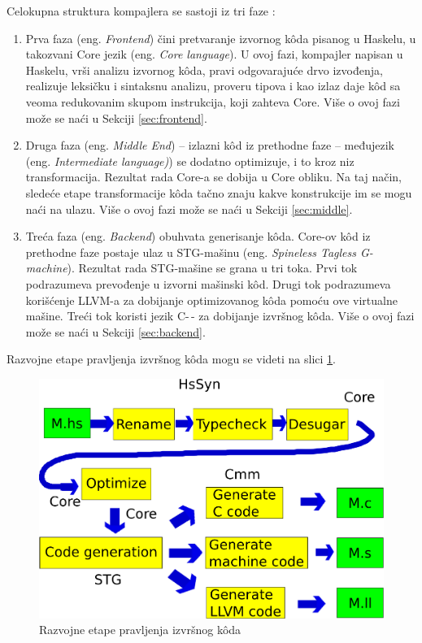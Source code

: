 Celokupna struktura kompajlera se sastoji iz tri faze :
\begin{enumerate}
	\item Prva faza (eng. \emph{Frontend}) čini pretvaranje izvornog k\^{o}da pisanog u Haskelu, u takozvani Core jezik (eng. \emph {Core language}). U ovoj fazi, kompajler napisan u Haskelu, vrši analizu izvornog k\^{o}da, pravi odgovarajuće drvo izvođenja, realizuje leksičku i sintaksnu analizu, proveru tipova i kao izlaz daje k\^{o}d sa veoma redukovanim skupom instrukcija, koji zahteva Core. Više o ovoj fazi može se naći u Sekciji \ref{sec:frontend}.
	\item Druga faza (eng. \emph {Middle End}) – izlazni k\^{o}d iz prethodne faze – međujezik (eng. \emph {Intermediate language)}) se dodatno optimizuje, i to kroz niz transformacija. Rezultat rada Core-a se dobija u Core obliku. Na taj način, sledeće etape transformacije k\^{o}da tačno znaju kakve konstrukcije im se mogu naći na ulazu.  Više o ovoj fazi može se naći u Sekciji \ref{sec:middle}.
	\item Treća faza (eng. \emph {Backend}) obuhvata generisanje k\^{o}da. Core-ov k\^{o}d iz prethodne faze postaje ulaz u STG-mašinu (eng. \emph {Spineless Tagless G-machine}). Rezultat rada STG-mašine se grana u tri toka. Prvi tok podrazumeva prevođenje u izvorni mašinski k\^{o}d. Drugi tok podrazumeva korišćenje LLVM-a za dobijanje optimizovanog k\^{o}da pomoću ove virtualne mašine. Treći tok koristi jezik C-\,- za dobijanje izvršnog k\^{o}da. Više o ovoj fazi može se naći u Sekciji \ref{sec:backend}.
\end{enumerate}

Razvojne etape pravljenja izvršnog k\^{o}da mogu se videti na slici \ref{fig:razvojneEtaple}.

\begin{figure}[h!]
	\begin{center}
		\includegraphics[scale=0.30]{resources/razvojneEtape.png}
	\end{center}
	\caption{Razvojne etape pravljenja izvršnog k\^{o}da}
	\label{fig:razvojneEtaple}
\end{figure}